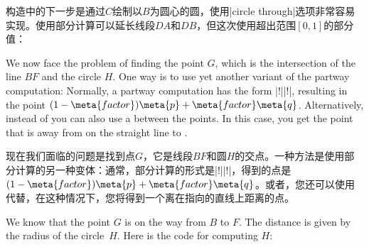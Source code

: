 构造中的下一步是通过$C$绘制以$B$为圆心的圆，使用|circle through|选项非常容易实现。使用部分计算可以延长线段$DA$和$DB$，但这次使用超出范围$[0,1]$的部分值：
%
\begin{codeexample}[preamble={\usetikzlibrary{calc,through}}]
\end{codeexample}

We now face the problem of finding the point $G$, which is the intersection of
the line $BF$ and the circle $H$. One way is to use yet another variant of the
partway computation: Normally, a partway computation has the form
|!||!|, resulting in the point
$(1-\meta{factor})\meta{p} + \meta{factor}\meta{q}$. Alternatively, instead of
 you can also use a  between the points. In this
case, you get the point that is  away from  on the
straight line to .

现在我们面临的问题是找到点$G$，它是线段$BF$和圆$H$的交点。一种方法是使用部分计算的另一种变体：通常，部分计算的形式是|!||!|，得到的点是$(1-\meta{factor})\meta{p} + \meta{factor}\meta{q}$。或者，您还可以使用代替，在这种情况下，您将得到一个离在指向的直线上距离的点。

We know that the point $G$ is on the way from $B$ to $F$. The distance is given
by the radius of the circle~$H$. Here is the code for computing $H$:

